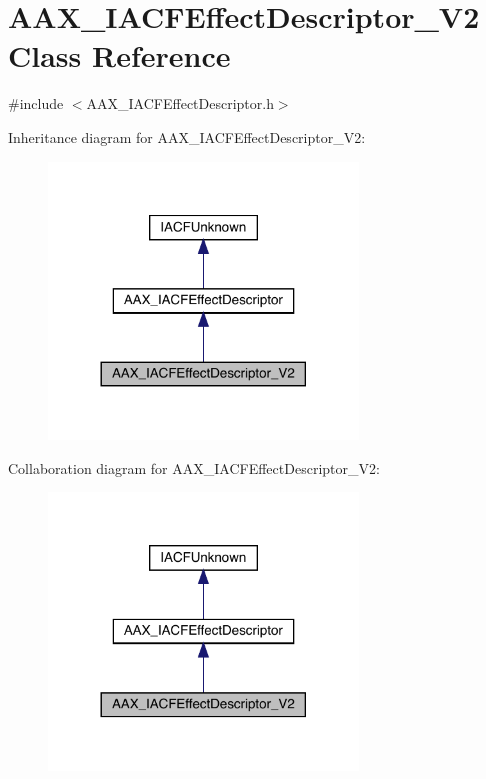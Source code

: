\hypertarget{a01657}{}\section{A\+A\+X\+\_\+\+I\+A\+C\+F\+Effect\+Descriptor\+\_\+\+V2 Class Reference}
\label{a01657}


{\ttfamily \#include $<$A\+A\+X\+\_\+\+I\+A\+C\+F\+Effect\+Descriptor.\+h$>$}



Inheritance diagram for A\+A\+X\+\_\+\+I\+A\+C\+F\+Effect\+Descriptor\+\_\+\+V2\+:
\nopagebreak
\begin{figure}[H]
\begin{center}
\leavevmode
\includegraphics[width=233pt]{a01656}
\end{center}
\end{figure}


Collaboration diagram for A\+A\+X\+\_\+\+I\+A\+C\+F\+Effect\+Descriptor\+\_\+\+V2\+:
\nopagebreak
\begin{figure}[H]
\begin{center}
\leavevmode
\includegraphics[width=233pt]{a01655}
\end{center}
\end{figure}


